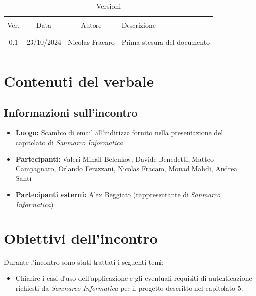 \documentclass[italian, 12pt]{article}
\begin{document}
\pagestyle{mystyle}


\begin{table}[!h]
	\caption{Versioni}
	\begin{center}
		\begin{tabular}{ c c c p{9cm}}
			\hline \\[-2ex]
			Ver. & Data & Autore & Descrizione \\
			\\[-2ex] \hline \\[-1.5ex]
			0.1 & 23/10/2024 & Nicolas Fracaro& Prima stesura del documento\\
			\\[-1.5ex] \hline
		\end{tabular}
	\end{center}
\end{table}


\tableofcontents
\newpage

\section{Contenuti del verbale}

\subsection{Informazioni sull'incontro}
\begin{itemize}
    \item \textbf{Luogo:} Scambio di email all'indirizzo fornito nella presentazione del capitolato di \textit{Sanmarco Informatica}
    \item \textbf{Partecipanti:} Valeri Mihail Belenkov, Davide Benedetti, Matteo Campagnaro, Orlando Ferazzani, Nicolas Fracaro, Mouad Mahdi, Andrea Santi
    \item \textbf{Partecipanti esterni:} Alex Beggiato (rappresentante di \textit{Sanmarco Informatica})
\end{itemize}

\section{Obiettivi dell'incontro}
Durante l'incontro sono stati trattati i seguenti temi:
\begin{itemize}
    \item Chiarire i casi d'uso dell'applicazione e gli eventuali requisiti di autenticazione richiesti da \textit{Sanmarco Informatica} per il progetto descritto nel capitolato 5.
\end{itemize}
\end{document}
